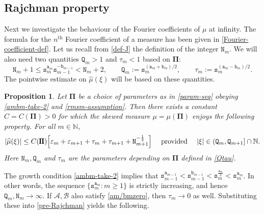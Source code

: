 \documentclass[12pt, twoside]{article}
\newtheorem{proposition}[theorem]{Proposition}
\theoremstyle{definition}
\numberwithin{equation}{section}
\begin{document}
\subsection{Rajchman property}
Next we investigate the behaviour of the Fourier coefficients of $\mu$ at infinity. The formula for the $n^{\text{th}}$ Fourier coefficient of a measure has been given in \eqref{Fourier-coefficient-def}. Let us recall from \eqref{def-J} the definition of the integer $\mathtt N_m$. We will also need two quantities $\mathtt Q_m > 1$ and $\mathtt \tau_m < 1$ based on $\pmb{\Pi}$:  
\begin{equation} \label{Qtau}
\mathtt N_m + 1 \leq \mathtt s_m^{\mathtt a_m} \mathtt s_{m-1}^{-\mathtt b_{m-1}} < \mathtt N_m + 2, \qquad \mathtt Q_m := \mathtt s_m^{{(\mathtt a_m + \mathtt b_m)}/{2}}, \qquad \tau_m := \mathtt s_m^{{(\mathtt a_m - \mathtt b_m)}/{2}}.
\end{equation} 
The pointwise estimate on $\widehat{\mu}(\xi)$ will be based on these quantities.
\begin{proposition}
\label{Rajchman-prop}
Let $\pmb{\Pi}$ be a choice of parameters as in \eqref{param-seq} obeying \eqref{ambm-take-2} and \eqref{rmsm-assumption}. 
Then there exists a constant $C = C(\pmb{\Pi}) > 0$ for which the skewed measure $\mu = \mu(\pmb{\Pi})$ enjoys  the following property. 
For all $m \in \mathbb N$,
\begin{equation} \label{pre-Rajchman}
|\widehat{\mu}(\xi)| \leq C(\pmb{\Pi}) \Bigl[ \varepsilon_{m} + \varepsilon_{m+1} + \tau_{m} + \tau_{m+1} + \mathtt N_{m+1}^{-\frac{1}{2}}\Bigr]  \quad
\text{ provided } \quad |\xi| \in (\mathtt Q_{m}, \mathtt Q_{m+1} ] \cap \mathbb N.  
\end{equation} 
Here $\mathtt N_m, \mathtt Q_m$ and $\tau_m$ are the parameters depending on $\pmb{\Pi}$ defined in \eqref{Qtau}. 
\end{proposition} 
\noindent The growth condition \eqref{ambm-take-2} implies that $\mathtt s_{m-1}^{\mathtt a_{m-1}} < \mathtt s_{m-1}^{\mathtt b_{m-1}} < \mathtt s_{m}^{\frac{\mathtt a_{m}}{3}} < \mathtt s_m^{\mathtt a_m}$. In other words, the sequence $\{\mathtt s_m^{\mathtt a_m}: m \geq 1\}$ is strictly increasing, and hence $\mathtt Q_m, \mathtt N_m \rightarrow \infty$. If $\mathcal A, \mathcal B$ also satisfy \eqref{am/bmzero}, then $\tau_m \rightarrow 0$ as well. Substituting these into \eqref{pre-Rajchman} yields the following.  
\end{document}
